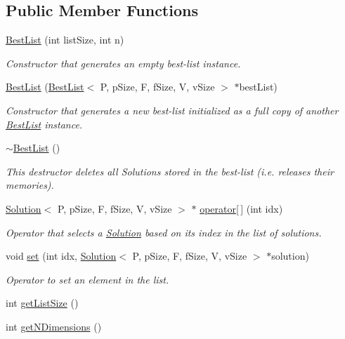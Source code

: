 \subsection*{Public Member Functions}
\begin{DoxyCompactItemize}
\item 
\hyperlink{classBestList_a4bd603848a6e66f1242323f945fedbe9}{Best\+List} (int list\+Size, int n)
\begin{DoxyCompactList}\small\item\em Constructor that generates an empty best-\/list instance. \end{DoxyCompactList}\item 
\hyperlink{classBestList_ae664f030cfdd2440bc05ef4873915d32}{Best\+List} (\hyperlink{classBestList}{Best\+List}$<$ P, p\+Size, F, f\+Size, V, v\+Size $>$ $\ast$best\+List)
\begin{DoxyCompactList}\small\item\em Constructor that generates a new best-\/list initialized as a full copy of another \hyperlink{classBestList}{Best\+List} instance. \end{DoxyCompactList}\item 
\hyperlink{classBestList_a7d0ac19666923c1c94a130a16b176125}{$\sim$\+Best\+List} ()
\begin{DoxyCompactList}\small\item\em This destructor deletes all Solutions stored in the best-\/list (i.\+e. releases their memories). \end{DoxyCompactList}\item 
\hyperlink{classSolution}{Solution}$<$ P, p\+Size, F, f\+Size, V, v\+Size $>$ $\ast$ \hyperlink{classBestList_a47b06e0c8d982f3d89769ce6b66adf0c}{operator\mbox{[}$\,$\mbox{]}} (int idx)
\begin{DoxyCompactList}\small\item\em Operator that selects a \hyperlink{classSolution}{Solution} based on its index in the list of solutions. \end{DoxyCompactList}\item 
void \hyperlink{classBestList_a4a5650fb72c71d6027540daa96de0d39}{set} (int idx, \hyperlink{classSolution}{Solution}$<$ P, p\+Size, F, f\+Size, V, v\+Size $>$ $\ast$solution)
\begin{DoxyCompactList}\small\item\em Operator to set an element in the list. \end{DoxyCompactList}\item 
int \hyperlink{classBestList_ac627a3267d2b7cf8f579cc7e5b77d2e3}{get\+List\+Size} ()
\item 
int \hyperlink{classBestList_adaf365728d0834a5f2b7f3c47dd76788}{get\+N\+Dimensions} ()
\end{DoxyCompactItemize}


